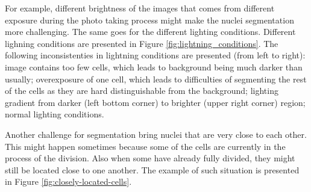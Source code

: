 For example, different brightness of the images that comes from different exposure during the photo taking process might make the nuclei segmentation more challenging. The same goes for the different lighting conditions. Different lighning conditions are presented in Figure \ref{fig:lightning_conditions}. The following inconsistenties in lightning conditions are presented (from left to right): image contains too few cells, which leads to background being much darker than usually; overexposure of one cell, which leads to difficulties of segmenting the rest of the cells as they are hard distinguishable from the background; lighting gradient from darker (left bottom corner) to brighter (upper right corner) region; normal lighting conditions.

Another challenge for segmentation bring nuclei that are very close to each other. This might happen sometimes because some of the cells are currently in the process of the division. Also when some have already fully divided, they might still be located close to one another. The example of such situation is presented in Figure \ref{fig:closely-located-cells}.


